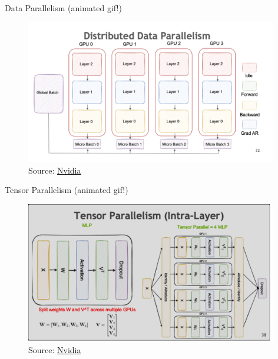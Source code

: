 
\begin{vbframe}{Data Parallelism (animated gif!)}

\vfill

\begin{figure}
	\centering
	\includegraphics[width = 11cm]{./figure/data_parallel.png} \\ 
	{\footnotesize Source: \href{https://docs.nvidia.com/deeplearning/nemo/user-guide/docs/en/stable/nlp/nemo_megatron/parallelisms.html}{Nvidia}}
\end{figure}

\vfill

\end{vbframe}


\begin{vbframe}{Tensor Parallelism (animated gif!)}

\vfill

\begin{figure}
	\centering
	\includegraphics[width = 11cm]{./figure/tensor_paralel.png} \\ 
	{\footnotesize Source: \href{https://docs.nvidia.com/deeplearning/nemo/user-guide/docs/en/stable/nlp/nemo_megatron/parallelisms.html}{Nvidia}}
\end{figure}

\vfill

\end{vbframe}

